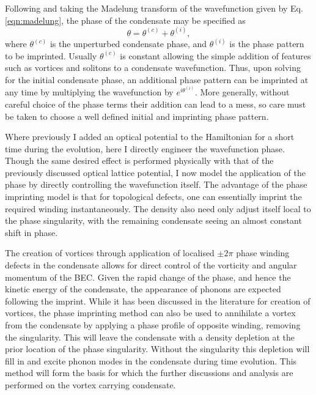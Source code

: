{Following \cite{BK:Pitaevskii_Stringari_2003} and taking the Madelung transform of the wavefunction given by Eq. \eqref{eqn:madelung}, the phase of the condensate may be specified as
\begin{equation}
\theta = \theta^{(c)} + \theta^{(i)},
\end{equation}
where $\theta^{(c)}$ is the unperturbed condensate phase, and $\theta^{(i)}$ is the phase pattern to be imprinted. Usually $\theta^{(c)}$ is constant allowing the simple addition of features such as vortices and solitons to a condensate wavefunction. Thus, upon solving for the initial condensate phase, an additional phase pattern can be imprinted at any time by multiplying the wavefunction by $e^{i\theta^{(i)}}$. More generally, without careful choice of the phase terms their addition can lead to a mess, so care must be taken to choose a well defined initial and imprinting phase pattern.

Where previously I added an optical potential to the Hamiltonian for a short time during the evolution, here I directly engineer the wavefunction phase. Though the same desired effect is performed physically with that of the previously discussed optical lattice potential, I now model the application of the phase by directly controlling the wavefunction itself. The advantage of the phase imprinting model is that for topological defects, one can essentially imprint the required winding instantaneously. The density also need only adjust itself local to the phase singularity, with the remaining condensate seeing an almost constant shift in phase.

The creation of vortices through application of localised $\pm 2\pi$ phase winding defects in the condensate allows for direct control of the vorticity and angular momentum of the BEC. Given the rapid change of the phase, and hence the kinetic energy of the condensate, the appearance of phonons are expected following the imprint. While it has been discussed in the literature for creation of vortices, the phase imprinting method can also be used to annihilate a vortex from the condensate by applying a phase profile of opposite winding, removing the singularity. This will leave the condensate with a density depletion at the prior location of the phase singularity. Without the singularity this depletion will fill in and excite phonon modes in the condensate during time evolution. This method will form the basis for which the further discussions and analysis are performed on the vortex carrying condensate.

}

